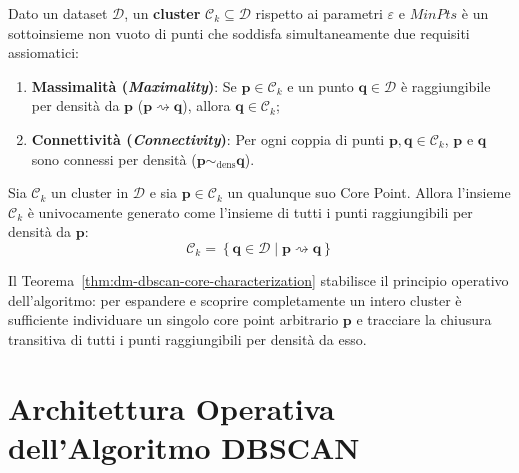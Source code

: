 \begin{definition}
Dato un dataset $\mathcal{D}$, un \textbf{cluster} $\mathcal{C}_k \subseteq \mathcal{D}$ rispetto ai parametri $\varepsilon$ e $MinPts$ è un sottoinsieme non vuoto di punti che soddisfa simultaneamente due requisiti assiomatici:
\begin{enumerate}
    \item \textbf{Massimalità (\textit{Maximality})}: Se $\mathbf{p} \in \mathcal{C}_k$ e un punto $\mathbf{q} \in \mathcal{D}$ è raggiungibile per densità da $\mathbf{p}$ ($\mathbf{p} \rightsquigarrow \mathbf{q}$), allora $\mathbf{q} \in \mathcal{C}_k$;
    \item \textbf{Connettività (\textit{Connectivity})}: Per ogni coppia di punti $\mathbf{p}, \mathbf{q} \in \mathcal{C}_k$, $\mathbf{p}$ e $\mathbf{q}$ sono connessi per densità ($\mathbf{p} \sim_{\mathrm{dens}} \mathbf{q}$).
\end{enumerate}
\end{definition}

\begin{theorem}
\label{thm:dm-dbscan-core-characterization}
Sia $\mathcal{C}_k$ un cluster in $\mathcal{D}$ e sia $\mathbf{p} \in \mathcal{C}_k$ un qualunque suo Core Point. Allora l'insieme $\mathcal{C}_k$ è univocamente generato come l'insieme di tutti i punti raggiungibili per densità da $\mathbf{p}$:
\begin{equation}
    \mathcal{C}_k = \left\{ \mathbf{q} \in \mathcal{D} \;\big|\; \mathbf{p} \rightsquigarrow \mathbf{q} \right\}
\end{equation}
\end{theorem}

Il Teorema~\ref{thm:dm-dbscan-core-characterization} stabilisce il principio operativo dell'algoritmo: per espandere e scoprire completamente un intero cluster è sufficiente individuare un singolo core point arbitrario $\mathbf{p}$ e tracciare la chiusura transitiva di tutti i punti raggiungibili per densità da esso.

\section{Architettura Operativa dell'Algoritmo DBSCAN}
\label{sec:dm-dbscan-algorithm}

